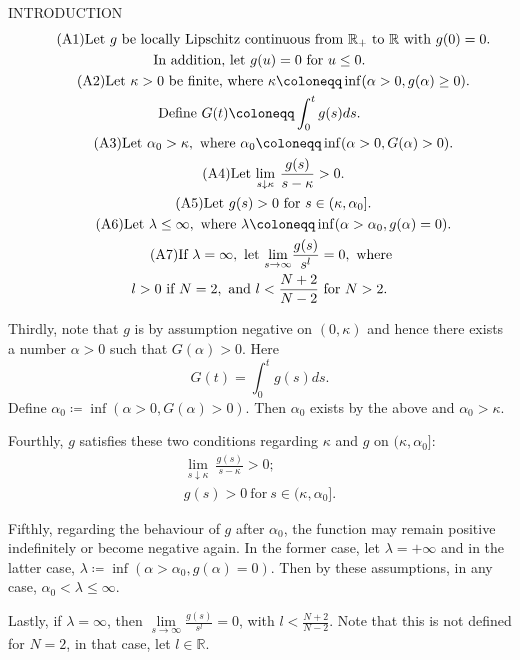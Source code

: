 {\color{red}INTRODUCTION}
\begin{gather}\tag{A1}\label{a1}\text{Let }g\text{ be locally Lipschitz continuous from }\mathbb{R}_+\text{ to }\mathbb{R}\text{ with }g(0)=0.\\
\notag\text{In addition, let }g(u)=0\text{ for }u\leq0.\\
%
\tag{A2}\label{a2}\text{Let }\kappa>0\text{ be finite, where }\kappa\coloneqq\inf(\alpha>0,g(\alpha)\geq0).\\
%
\notag\text{Define }G(t)\coloneqq\int_0^t g(s)ds.\\
%
\tag{A3}\label{a3}\text{Let }\alpha_0>\kappa,\text{ where }\alpha_0\coloneqq\inf(\alpha>0,G(\alpha)>0).\\
%
\tag{A4}\label{a4}\text{Let }\underset{s\downarrow\kappa}{\lim}~\frac{g(s)}{s-\kappa}>0.\\
%
\tag{A5}\label{a5}\text{Let }g(s)>0\text{ for }s\in(\kappa,\alpha_0].\\
%
\tag{A6}\label{a6}\text{Let }\lambda\leq\infty,\text{ where }\lambda\coloneqq\inf(\alpha>\alpha_0,g(\alpha)=0).\\
%
\tag{A7}\label{a7}\text{If }\lambda=\infty,\text{ let }\underset{s\to\infty}{\lim}\frac{g(s)}{s^l}=0,\text{ where }\\ \notag l>0\text{ if }N=2,\text{ and }l<\frac{N+2}{N-2}\text{ for }N>2.
\end{gather}
{\color{gray}
Thirdly, note that $g$ is by assumption negative on $(0,\kappa)$ and hence there exists a number $\alpha>0$ such that $G(\alpha)>0$. Here $$G(t)=\int_0^t g(s)ds.$$ Define $\alpha_0\coloneqq\inf(\alpha>0,G(\alpha)>0)$. Then $\alpha_0$ exists by the above and $\alpha_0>\kappa$.

Fourthly, $g$ satisfies these two conditions regarding $\kappa$ and $g$ on $(\kappa,\alpha_0]$:
\begin{gather}
\label{6}\underset{s\downarrow\kappa}{\lim}~\frac{g(s)}{s-\kappa}>0;\\
g(s)>0~\text{for}~s\in(\kappa,\alpha_0].
\end{gather}

Fifthly, regarding the behaviour of $g$ after $\alpha_0$, the function may remain positive indefinitely or become negative again. In the former case, let $\lambda=+\infty$ and in the latter case, $\lambda\coloneqq\inf(\alpha>\alpha_0,g(\alpha)=0)$. Then by these assumptions, in any case, $\alpha_0<\lambda\leq\infty$.

Lastly, if $\lambda=\infty$, then $\underset{s\to\infty}{\lim}\frac{g(s)}{s^l}=0$, with $l<\frac{N+2}{N-2}$. Note that this is not defined for $N=2$, in that case, let $l\in\mathbb{R}$.}

